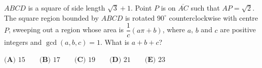 $ABCD$ is a square of side length $\sqrt{3}+1$. Point $P$ is on $\overline{AC}$ such that $AP=\sqrt{2}$. The square region bounded by $ABCD$ is rotated $90^\circ$ counterclockwise with centre $P$, sweeping out a region whose area is $\dfrac{1}{c}(a\pi+b)$, where $a$, $b$ and $c$ are positive integers and $\gcd(a,b,c)=1$. What is $a+b+c$?

$\textbf{(A) }15\qquad\textbf{(B) }17\qquad\textbf{(C) }19\qquad\textbf{(D) }21\qquad\textbf{(E) }23$
